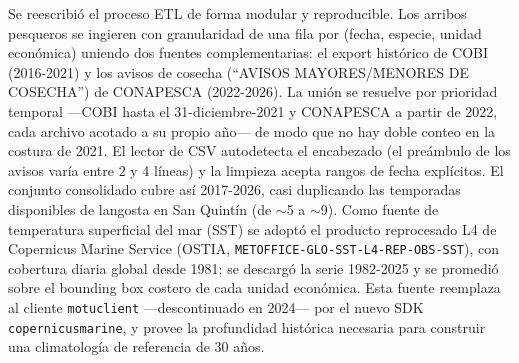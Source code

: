 Se reescribió el proceso ETL de forma modular y reproducible. Los arribos pesqueros se ingieren con granularidad de una fila por (fecha, especie, unidad económica) uniendo dos fuentes complementarias: el export histórico de COBI (2016-2021) y los avisos de cosecha (``AVISOS MAYORES/MENORES DE COSECHA'') de CONAPESCA (2022-2026). La unión se resuelve por prioridad temporal ---COBI hasta el 31-diciembre-2021 y CONAPESCA a partir de 2022, cada archivo acotado a su propio año--- de modo que no hay doble conteo en la costura de 2021. El lector de CSV autodetecta el encabezado (el preámbulo de los avisos varía entre 2 y 4 líneas) y la limpieza acepta rangos de fecha explícitos. El conjunto consolidado cubre así 2017-2026, casi duplicando las temporadas disponibles de langosta en San Quintín (de $\sim$5 a $\sim$9). Como fuente de temperatura superficial del mar (SST) se adoptó el producto reprocesado L4 de Copernicus Marine Service (OSTIA, \texttt{METOFFICE-GLO-SST-L4-REP-OBS-SST}), con cobertura diaria global desde 1981; se descargó la serie 1982-2025 y se promedió sobre el bounding box costero de cada unidad económica. Esta fuente reemplaza al cliente \texttt{motuclient} —descontinuado en 2024— por el nuevo SDK \texttt{copernicusmarine}, y provee la profundidad histórica necesaria para construir una climatología de referencia de 30 años.
